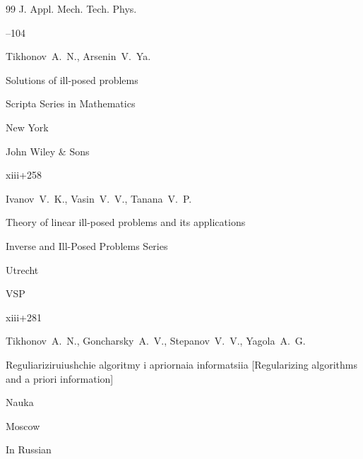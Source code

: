 \begin{thebibliography}{99}
\jour J. Appl. Mech. Tech. Phys.




--104





\by Tikhonov~A.~N., Arsenin~V.~Ya.

\book Solutions of ill-posed problems


\serial Scripta Series in Mathematics

\publaddr New York 

\publ John Wiley \& Sons

\totalpages xiii+258 





\by Ivanov~V.~K., Vasin~V.~V., Tanana~V.~P.

\book Theory of linear ill-posed problems and its applications


\serial Inverse and Ill-Posed Problems Series

\publaddr Utrecht

\publ VSP 

\totalpages xiii+281 












\by Tikhonov~A.~N., Goncharsky~A.~V., Stepanov~V.~V., Yagola~A.~G. 

\book Reguliariziruiushchie algoritmy i apriornaia informatsiia \rm [Regularizing algorithms and a priori information]


\publ Nauka

\publaddr Moscow

\lang In Russian






\end{thebibliography}
